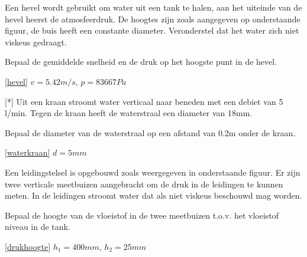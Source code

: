 	\begin{toepassing}[*]
		\label{hevel}
Een hevel wordt gebruikt om water uit een tank te halen, aan het uiteinde van de hevel heerst de atmosfeerdruk. De hoogtes zijn zoals aangegeven op onderstaande figuur, de buis heeft een constante diameter. Veronderstel dat het water zich niet viskeus gedraagt.
		
Bepaal de gemiddelde snelheid en de druk op het hoogste punt in de hevel.
		\begin{center}
			
		\end{center}
	\end{toepassing}
	\begin{antwoord}{\ref{hevel}}
		$v = \unit{5.42}{m/s}$, $p = \unit{83667}{Pa}$
	\end{antwoord}
	\begin{toepassing}
		\label{waterkraan}[*]
Uit een kraan stroomt water verticaal naar beneden met een debiet van 5 l/min. Tegen de kraan heeft de waterstraal een diameter van 18mm. 

Bepaal de diameter van de waterstraal op een afstand van 0.2m onder de kraan.
		\begin{center}
			
		\end{center}
	\end{toepassing}
	\begin{antwoord}{\ref{waterkraan}}
		$d = \unit{5}{mm}$
	\end{antwoord}
	\begin{toepassing}
		\label{drukhoogte}
Een leidingstelsel is opgebouwd zoals weergegeven in onderstaande figuur. Er zijn twee verticale meetbuizen aangebracht om de druk in de leidingen te kunnen meten. In de leidingen stroomt water dat als niet viskeus beschouwd mag worden.
		
Bepaal de hoogte van de vloeistof in de twee meetbuizen t.o.v. het vloeistof niveau in de tank.
		\begin{center}
			
		\end{center}
	\end{toepassing}
	\begin{antwoord}{\ref{drukhoogte}}
		$h_1 = \unit{400}{mm}$, $h_2 = \unit{25}{mm}$
	\end{antwoord}
